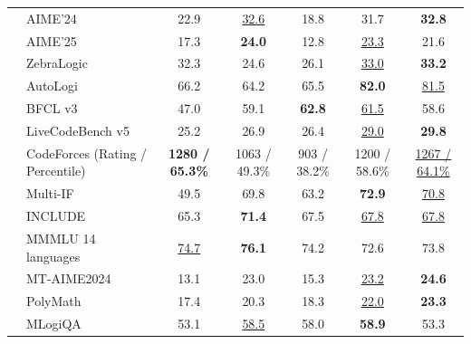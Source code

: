\begin{table}[tbp]
{\begin{tabular}{@{}clccccc@{}}
& AIME'24 & 22.9 & \underline{32.6} & 18.8 & 31.7 & \textbf{32.8} \\
& AIME'25 & 17.3 & \textbf{24.0} & 12.8 & \underline{23.3} & 21.6 \\
& ZebraLogic & 32.3 & 24.6 & 26.1 & \underline{33.0} & \textbf{33.2} \\
& AutoLogi & 66.2 & 64.2 & 65.5 & \textbf{82.0} & \underline{81.5} \\
\midrule
{} & BFCL v3 & 47.0 & 59.1 & \textbf{62.8} & \underline{61.5} & 58.6 \\
& LiveCodeBench v5 & 25.2 & 26.9 & 26.4 & \underline{29.0} & \textbf{29.8} \\
& CodeForces {\tiny{(Rating / Percentile)}} & \textbf{1280 / 65.3\%} & 1063 / 49.3\% & 903 / 38.2\% & 1200 / 58.6\% & \underline{1267 / 64.1\%} \\
\midrule
{} & Multi-IF & 49.5 & 69.8 & 63.2 & \textbf{72.9} & \underline{70.8} \\
& INCLUDE & 65.3 & \textbf{71.4} & 67.5 & \underline{67.8} & \underline{67.8} \\
& MMMLU {\tiny{14 languages}} & \underline{74.7} & \textbf{76.1} & 74.2 & 72.6 & 73.8 \\
& MT-AIME2024 & 13.1 & 23.0 & 15.3 & \underline{23.2} & \textbf{24.6} \\
& PolyMath & 17.4 & 20.3 & 18.3 & \underline{22.0} & \textbf{23.3} \\
& MLogiQA & 53.1 & \underline{58.5} & 58.0 & \textbf{58.9} & 53.3 \\
\bottomrule
\end{tabular}
}
\end{table}


